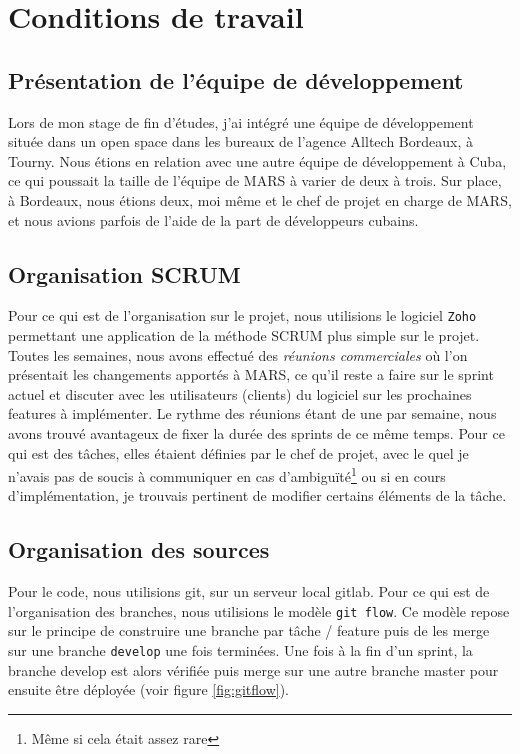 \section{Conditions de travail} \label{sec:conditions_travail}

\subsection{Présentation de l'équipe de développement} \label{sec:presentation_equipe}

Lors de mon stage de fin d'études, j'ai intégré une équipe de développement située dans un open space dans les bureaux
de l'agence Alltech Bordeaux, à Tourny. Nous étions en relation avec une autre équipe de développement à Cuba, ce qui
poussait la taille de l'équipe de MARS à varier de deux à trois. Sur place, à Bordeaux, nous étions deux, moi même et 
le chef de projet en charge de MARS, et nous avions parfois de l'aide de la part de développeurs cubains. 

\subsection{Organisation SCRUM} \label{sec:organisation_scrum}

Pour ce qui est de l'organisation sur le projet, nous utilisions le logiciel \texttt{Zoho} permettant une application
de la méthode SCRUM plus simple sur le projet. Toutes les semaines, nous avons effectué des \textit{réunions 
commerciales} où l'on présentait les changements apportés à MARS, ce qu'il reste a faire sur le sprint actuel et 
discuter avec les utilisateurs (clients) du logiciel sur les prochaines features à implémenter. Le rythme des réunions
étant de une par semaine, nous avons trouvé avantageux de fixer la durée des sprints de ce même temps. Pour ce qui est 
des tâches, elles étaient définies par le chef de projet, avec le quel je n'avais pas de soucis à communiquer en cas 
d'ambiguïté\footnote{Même si cela était assez rare} ou si en cours d'implémentation, je trouvais pertinent de modifier
certains éléments de la tâche.

\subsection{Organisation des sources} \label{sec:organisation_sources}

Pour le code, nous utilisions git, sur un serveur local gitlab. Pour ce qui est de l'organisation des branches, nous 
utilisions le modèle \texttt{git flow}. Ce modèle repose sur le principe de construire une branche par tâche / feature 
puis de les merge sur une branche \texttt{develop} une fois terminées. Une fois à la fin d'un sprint, la branche 
develop est alors vérifiée puis merge sur une autre branche master pour ensuite être déployée (voir figure 
\ref{fig:gitflow}).

